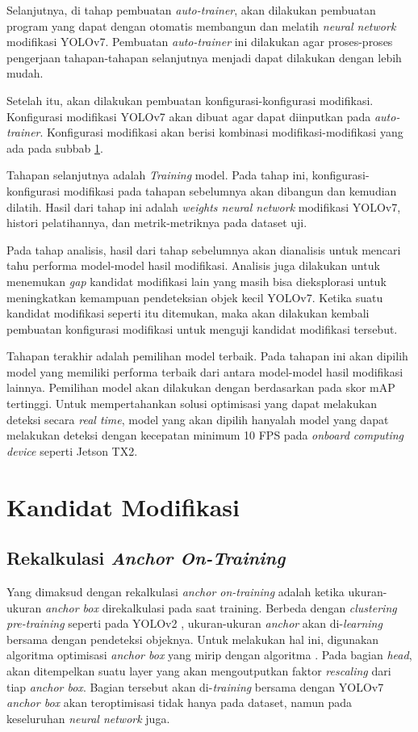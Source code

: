   Selanjutnya, di tahap pembuatan \emph{auto-trainer}, akan dilakukan pembuatan program yang dapat dengan otomatis membangun dan melatih \emph{neural network} modifikasi YOLOv7.
  Pembuatan \emph{auto-trainer} ini dilakukan agar proses-proses pengerjaan tahapan-tahapan selanjutnya menjadi dapat dilakukan dengan lebih mudah.

  Setelah itu, akan dilakukan pembuatan konfigurasi-konfigurasi modifikasi.
  Konfigurasi modifikasi YOLOv7 akan dibuat agar dapat diinputkan pada \emph{auto-trainer}.
  Konfigurasi modifikasi akan berisi kombinasi modifikasi-modifikasi yang ada pada subbab \ref{section:modificationcandidates}.

  Tahapan selanjutnya adalah \emph{Training} model.
  Pada tahap ini, konfigurasi-konfigurasi modifikasi pada tahapan sebelumnya akan dibangun dan kemudian dilatih.
  Hasil dari tahap ini adalah \emph{weights neural network} modifikasi YOLOv7, histori pelatihannya, dan metrik-metriknya pada dataset uji.

  Pada tahap analisis, hasil dari tahap sebelumnya akan dianalisis untuk mencari tahu performa model-model hasil modifikasi.
  Analisis juga dilakukan untuk menemukan \emph{gap} kandidat modifikasi lain yang masih bisa dieksplorasi untuk meningkatkan kemampuan pendeteksian objek kecil YOLOv7.
  Ketika suatu kandidat modifikasi seperti itu ditemukan, maka akan dilakukan kembali pembuatan konfigurasi modifikasi untuk menguji kandidat modifikasi tersebut.

  Tahapan terakhir adalah pemilihan model terbaik.
  Pada tahapan ini akan dipilih model yang memiliki performa terbaik dari antara model-model hasil modifikasi lainnya.
  Pemilihan model akan dilakukan dengan berdasarkan pada skor mAP tertinggi.
  Untuk mempertahankan solusi optimisasi yang dapat melakukan deteksi secara \emph{real time}, model yang akan dipilih hanyalah model yang dapat melakukan deteksi dengan kecepatan minimum 10 FPS pada \emph{onboard computing device} seperti Jetson TX2.


\section{Kandidat Modifikasi}
\label{section:modificationcandidates}
  \subsection{Rekalkulasi \emph{Anchor On-Training}}
    Yang dimaksud dengan rekalkulasi \emph{anchor on-training}  adalah ketika ukuran-ukuran \emph{anchor box} direkalkulasi pada saat training.
    Berbeda dengan \emph{clustering pre-training} seperti pada YOLOv2 \parencite{yolov2}, ukuran-ukuran \emph{anchor} akan di-\emph{learning} bersama dengan pendeteksi objeknya.
    Untuk melakukan hal ini, digunakan algoritma optimisasi \emph{anchor box} yang mirip dengan algoritma \textcite{anchoropt}.
    Pada bagian \emph{head}, akan ditempelkan suatu layer yang akan mengoutputkan faktor \emph{rescaling} dari tiap \emph{anchor box}.
    Bagian tersebut akan di-\emph{training} bersama dengan YOLOv7 \emph{anchor box} akan teroptimisasi tidak hanya pada dataset, namun pada keseluruhan \emph{neural network} juga.
